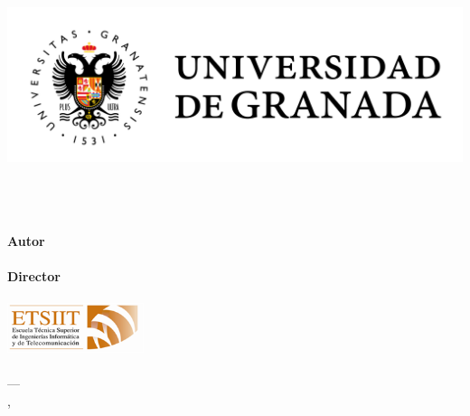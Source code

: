 \begin{titlepage}
 
 
\newlength{\centeroffset}
\setlength{\centeroffset}{-0.5\oddsidemargin}
\addtolength{\centeroffset}{0.5\evensidemargin}
\thispagestyle{empty}

\noindent\hspace*{\centeroffset}\begin{minipage}{\textwidth}

\centering
\includegraphics[width=1.0\textwidth]{images/logo_ugr.jpg}\\[1.3cm]

\textsc{ \Large \mySubject\\[0.2cm]}
\textsc{ \myDegree}\\[1cm]
% 
\vspace{0.3cm}
{\huge\bfseries \myTitle\\
}
\vspace{0.7cm}
\end{minipage}

\vspace{2.5cm}
\noindent\hspace*{\centeroffset}\begin{minipage}{\textwidth}
\centering

\textbf{Autor}\\ {\myName}\\[2.5ex]
\textbf{Director}\\ {\myProf}\\[2cm]
\includegraphics[width=0.3\textwidth]{images/etsiit_logo.png}\\[0.1cm]
\textsc{\myFaculty}\\
\textsc{---}\\
\myLocation, \myTime
\end{minipage}
\end{titlepage}


